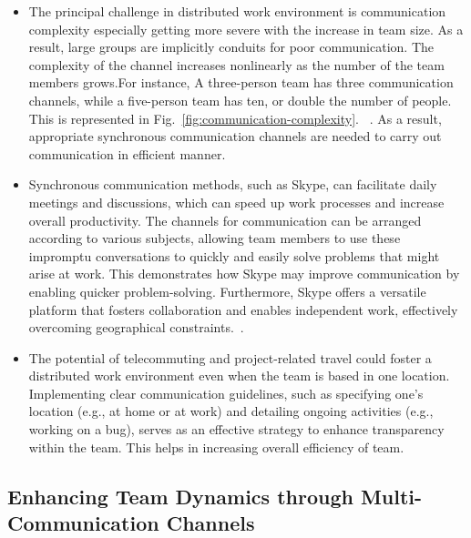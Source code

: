 \documentclass{llncs}
\begin{document}
\begin{itemize}
    \item The principal challenge in distributed work environment is  communication complexity especially getting more severe with the increase in team size. As a result, large groups are implicitly conduits for poor communication. The complexity of the channel increases nonlinearly as the number of the team members grows.For instance, A three-person team has three communication channels, while a five-person team has ten, or double the number of people. This is represented in Fig.~\ref{fig:communication-complexity}. ~\cite{refpaper7}. As a result, appropriate synchronous communication channels are needed to carry out communication in efficient manner.~\cite{refpaper7} \\ 
    \item Synchronous communication methods, such as Skype, can facilitate daily meetings and discussions, which can speed up work processes and increase overall productivity. The channels for communication can be arranged according to various subjects, allowing team members to use these impromptu conversations to quickly and easily solve problems that might arise at work. This demonstrates how Skype may improve communication by enabling quicker problem-solving. Furthermore, Skype offers a versatile platform that fosters collaboration and enables independent work, effectively overcoming geographical constraints.~\cite{refpaper8}. \\
    \item The potential of telecommuting and project-related travel could foster a distributed work environment even when the team is based in one location. Implementing clear communication guidelines, such as specifying one's location (e.g., at home or at work) and detailing ongoing activities (e.g., working on a bug), serves as an effective strategy to enhance transparency within the team. This helps in increasing overall efficiency of team.~\cite{refpaper8} \\
\end{itemize}

\subsection{Enhancing Team Dynamics through Multi-Communication Channels}
\end{document}
